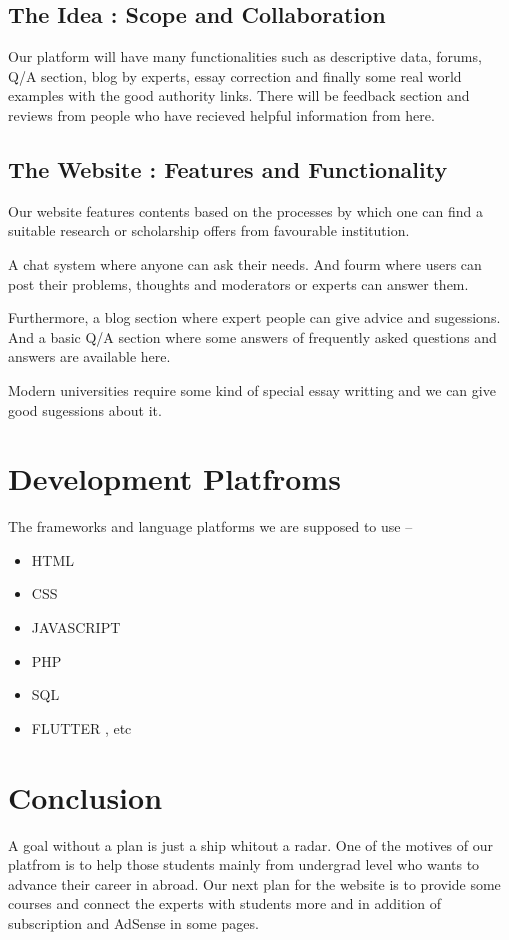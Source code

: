 \documentclass[a4paper,12pt]{report}
\begin{document}
\subsection*{The Idea : Scope and Collaboration}
Our platform will have many functionalities such as descriptive data, forums, Q/A section, blog by experts, essay correction and finally some real world examples with the good authority links. There will be feedback section and reviews from people who have recieved helpful information from here.

\subsection*{The Website : Features and Functionality}
Our website features contents based on the processes by which one can find a suitable research or scholarship offers from favourable institution.

A chat system where anyone can ask their needs. And fourm where users can post their problems, thoughts and moderators or experts can answer them.

Furthermore, a blog section where expert people can give advice and sugessions. And a basic Q/A section where some answers of frequently asked questions and answers are available here.

Modern universities require some kind of special essay writting and we can give good sugessions about it.


\section*{Development Platfroms}
The frameworks and language platforms we are supposed to use --
\begin{itemize}
	\item HTML
	\item CSS
	\item JAVASCRIPT
	\item PHP
	\item SQL
	\item FLUTTER , etc
\end{itemize}

\section*{Conclusion}
A goal without a plan is just a ship whitout a radar. One of the motives of our platfrom is to help those students mainly from undergrad level who wants to advance their career in abroad. Our next plan for the website is to provide some courses and connect the experts with students more and in addition of subscription and AdSense in some pages.
\end{document}
